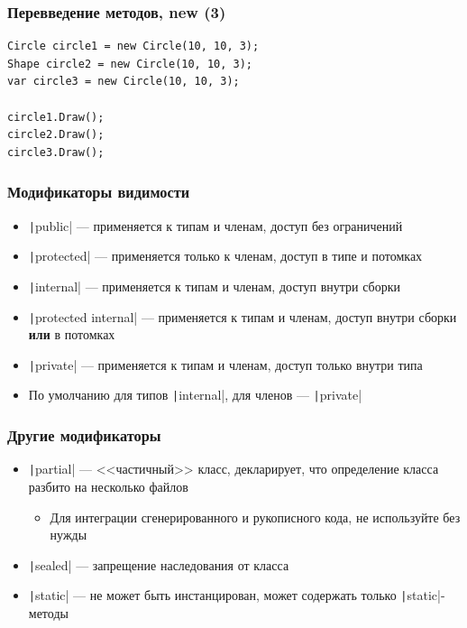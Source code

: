 \documentclass[xetex,mathserif,serif]{beamer}
\begin{document}
	\begin{frame}[fragile]
		\frametitle{Перевведение методов, new (3)}
		\begin{verbatim}
Circle circle1 = new Circle(10, 10, 3);
Shape circle2 = new Circle(10, 10, 3);
var circle3 = new Circle(10, 10, 3);

circle1.Draw();
circle2.Draw();
circle3.Draw();
		\end{verbatim}
\end{frame}

	\begin{frame}
		\frametitle{Модификаторы видимости}
		\begin{itemize}
			\item \texttt|public| --- применяется к типам и членам, доступ без ограничений
			\item \texttt|protected| --- применяется только к членам, доступ в типе и потомках
			\item \texttt|internal| --- применяется к типам и членам, доступ внутри сборки
			\item \texttt|protected internal| --- применяется к типам и членам, доступ внутри сборки \textbf{или} в потомках
			\item \texttt|private| --- применяется к типам и членам, доступ только внутри типа
			\item По умолчанию для типов \texttt|internal|, для членов --- \texttt|private|
		\end{itemize}
	\end{frame}

	\begin{frame}
		\frametitle{Другие модификаторы}
		\begin{itemize}
			\item \texttt|partial| --- <<частичный>> класс, декларирует, что определение класса разбито на несколько файлов
			\begin{itemize}
				\item Для интеграции сгенерированного и рукописного кода, не используйте без нужды
			\end{itemize}
			\item \texttt|sealed| --- запрещение наследования от класса
			\item \texttt|static| --- не может быть инстанцирован, может содержать только \texttt|static|-методы
		\end{itemize}
	\end{frame}
\end{document}
